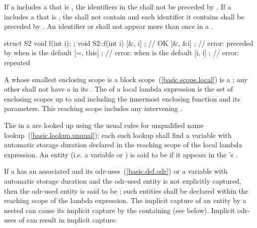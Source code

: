 \pnum
If a  includes a  that
is \tcode{\&}, the identifiers in the  shall not be preceded
by \tcode{\&}. If a  includes a
 that is \tcode{=}, the  shall
not contain  and each identifier it contains shall be preceded by
\tcode{\&}. An identifier or  shall not appear more than once in a
. \enterexample

\begin{codeblock}
struct S2 { void f(int i); };
void S2::f(int i) {
  [&, i]{ };    // OK
  [&, &i]{ };   // error:  preceded by \tcode{\&} when \tcode{\&} is the default
  [=, this]{ }; // error:  when \tcode{=} is the default
  [i, i]{ };    // error:  repeated
}
\end{codeblock}
\exitexample

\pnum
A  whose smallest enclosing scope is a block
scope~(\ref{basic.scope.local}) is a ; any other
 shall not have a  in its
. The  of a local lambda expression
is the set of enclosing scopes up to and including the innermost enclosing function and
its parameters. \enternote This reaching scope includes any intervening
. \exitnote

\pnum
The  in a  are looked up using the
usual rules for unqualified name lookup~(\ref{basic.lookup.unqual}); each such lookup
shall find a variable with automatic storage duration declared in
the reaching scope of the local lambda expression. An entity (i.e. a variable or
) is said to be  if it appears in the
's .

\pnum
If a  has an associated  and
its  odr-uses~(\ref{basic.def.odr})  or a
variable with automatic storage duration and the odr-used entity is not explicitly
captured, then the odr-used entity is said to be ; such
entities shall be declared within the reaching scope of the lambda expression.
\enternote The implicit capture of an entity by a nested
 can cause its implicit capture by the containing
 (see below). Implicit odr-uses of  can result
in implicit capture. \exitnote

